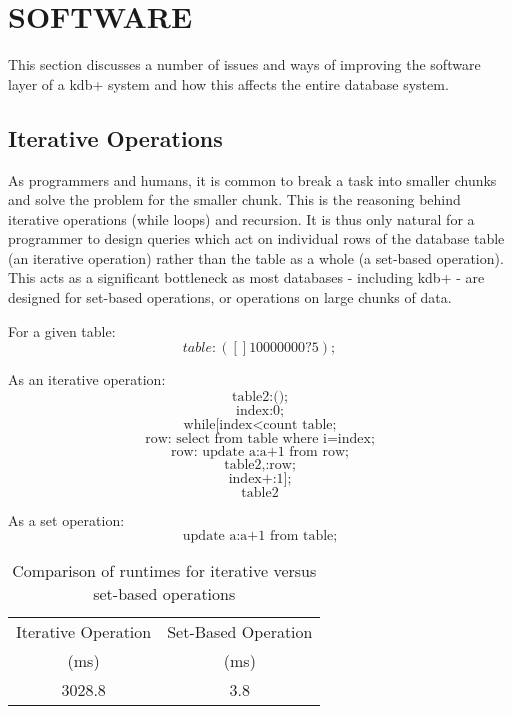 \section{SOFTWARE} %
\label{sec:software}
This section discusses a number of issues and ways of improving the software layer of a kdb+ system and how this affects the entire database system.

\subsection{Iterative Operations} %
\label{sub:while_loops}
As programmers and humans, it is common to break a task into smaller chunks and solve the problem for the smaller chunk.  This is the reasoning behind iterative operations (while loops) and recursion.  It is thus only natural for a programmer to design queries which act on individual rows of the database table (an iterative operation) rather than the table as a whole (a set-based operation).  This acts as a significant bottleneck as most databases - including kdb+ - are designed for set-based operations, or operations on large chunks of data.\newline

For a given table:
\[table: ([] 10000000?5);\]

As an iterative operation:
\[\textrm{table2:();}\]
\[\textrm{index:0;}\]
\[\textrm{while[index}<\textrm{count table;}\]
\[\textrm{row: select from table where i=index;}\]
\[\textrm{row: update a:a+1 from row;}\]
\[\textrm{table2,:row;}\]
\[\textrm{index+:1];}\]
\[\textrm{table2}\]

As a set operation:
\[\textrm{update a:a+1 from table;}\]

\begin{table}[ht]
	\centering
	\caption[Comparison of runtimes for iterative versus set-based operations]{Comparison of runtimes for iterative versus set-based operations}
	\label{tab:while_loop_example}
	\begin{tabular}{cc} 
		\toprule
		Iterative Operation & Set-Based Operation \\
		(ms)				& (ms) \\ \toprule
		3028.8				& 3.8 \\
		\bottomrule
	\end{tabular}
\end{table}

